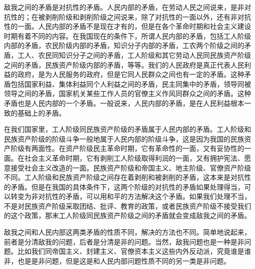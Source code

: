 \documentclass[UTF8, 12pt, a4paper]{ctexrep}
\begin{document}
敌我之间的矛盾是对抗性的矛盾。人民内部的矛盾，在劳动人民之间说来，是非对抗性的；在被剥削阶级和剥削阶级之间说来，除了对抗性的一面以外，还有非对抗性的一面。人民内部的矛盾不是现在才有的，但是在各个革命时期和社会主义建设时期有着不同的内容。在我国现在的条件下，所谓人民内部的矛盾，包括工人阶级内部的矛盾，农民阶级内部的矛盾，知识分子内部的矛盾，工农两个阶级之间的矛盾，工人、农民同知识分子之间的矛盾，工人阶级和其它劳动人民同民族资产阶级之间的矛盾，民族资产阶级内部的矛盾，等等。我们的人民政府是真正代表人民利益的政府，是为人民服务的政府，但是它同人民群众之间也有一定的矛盾。这种矛盾包括国家利益、集体利益同个人利益之间的矛盾，民主同集中的矛盾，领导同被领导之间的矛盾，国家机关某些工作人员的官僚主义作风同群众之间的矛盾。这种矛盾也是人民内部的一个矛盾。一般说来，人民内部的矛盾，是在人民利益根本一致的基础上的矛盾。

在我们国家里，工人阶级同民族资产阶级的矛盾属于人民内部的矛盾。工人阶级和民族资产阶级的阶级斗争一般地属于人民内部的阶级斗争，这是因为我国的民族资产阶级有两面性。在资产阶级民主革命时期，它有革命性的一面，又有妥协性的一面。在社会主义革命时期，它有剥削工人阶级取得利润的一面，又有拥护宪法、愿意接受社会主义改造的一面。民族资产阶级和帝国主义、地主阶级、官僚资产阶级不同。工人阶级和民族资产阶级之间存在着剥削和被剥削的矛盾，这本来是对抗性的矛盾。但是在我国的具体条件下，这两个阶级的对抗性的矛盾如果处理得当，可以转变为非对抗性的矛盾，可以用和平的方法解决这个矛盾。如果我们处理不当，不是对民族资产阶级采取团结、批评、教育的政策，或者民族资产阶级不接受我们的这个政策，那末工人阶级同民族资产阶级之间的矛盾就会变成敌我之间的矛盾。

敌我之间和人民内部这两类矛盾的性质不同，解决的方法也不同。简单地说起来，前者是分清敌我的问题，后者是分清是非的问题。当然，敌我问题也是一种是非问题。比如我们同帝国主义、封建主义、官僚资本主义这些内外反动派，究竟谁是谁非，也是是非问题，但是这是和人民内部问题性质不同的另一类是非问题。
\end{document}
